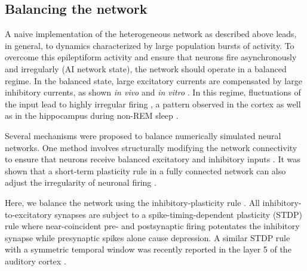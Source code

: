   \subsection{Balancing the network}
  \label{sec:asss_bal}
    A naive implementation of the heterogeneous network as described above
    leads, in general, to dynamics characterized by large population bursts of
    activity. To overcome this epileptiform activity and ensure that neurons
    fire asynchronously and irregularly (AI network state), the network should
    operate in a balanced regime. In the balanced state, large excitatory
    currents are compensated by large inhibitory currents, as shown \textit{in
    vivo} \citep{Okun2008, Cafaro2010} and \textit{in vitro} \citep{Xue2014}. In
    this regime, fluctuations of the input lead to highly irregular firing
    \citep{vanVreeswijk1996, vanVreeswijk1998}, a pattern observed in the cortex
    \citep{Abeles1991, Softky1993} as well as in the hippocampus during non-REM
    sleep \citep{Csicsvari1999, Poe2010}.
    
    Several mechanisms were proposed to balance numerically simulated neural
    networks. One method involves structurally modifying the network
    connectivity to ensure that neurons receive balanced excitatory and
    inhibitory inputs \citep{Renart2007, Roudi2007}. It was shown that a
    short-term plasticity rule \citep{Tsodyks1997} in a fully connected network
    can also adjust the irregularity of neuronal firing \citep{Barbieri2008}.

    Here, we balance the network using the inhibitory-plasticity rule
    \citep{Vogels2011}. All inhibitory-to-excitatory synapses are subject to a
    spike-timing-dependent plasticity (STDP) rule where near-coincident pre-
    and postsynaptic firing potentates the inhibitory synapse while presynaptic
    spikes alone cause depression. A similar STDP rule with a symmetric
    temporal window was recently reported in the layer 5 of the auditory cortex
    \citep{Damour2015}.

